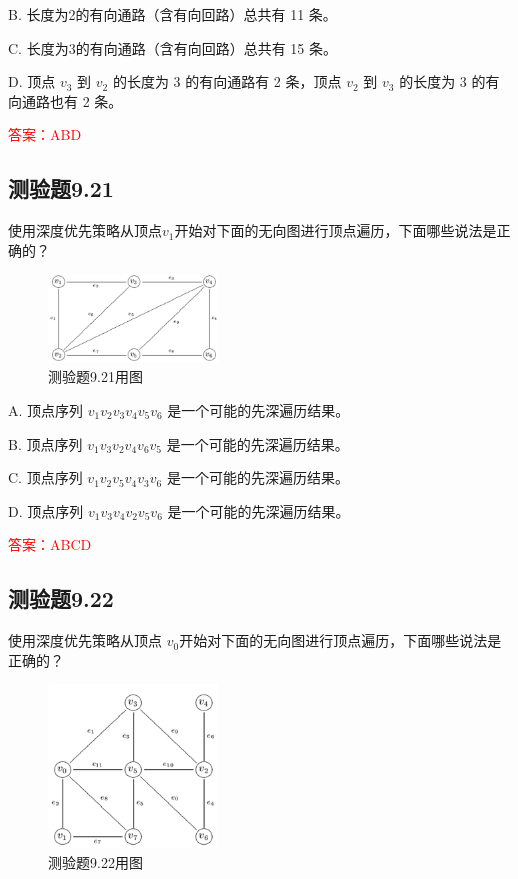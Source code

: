 \documentclass[UTF8, heading=true]{ctexart}
\begin{document}
B. 长度为2的有向通路（含有向回路）总共有 11 条。

C. 长度为3的有向通路（含有向回路）总共有 15 条。

D. 顶点 $v_3$ 到 $v_2$ 的长度为 3 的有向通路有 2 条，顶点 $v_2$ 到 $v_3$ 的长度为 3 的有向通路也有 2 条。

\textcolor{red}{答案：ABD}

\subsection{测验题9.21}

使用深度优先策略从顶点$v_1$开始对下面的无向图进行顶点遍历，下面哪些说法是正确的？

\begin{figure}[H]
  \centering
  \includegraphics[width=0.4\textwidth]{9.21.jpg} %
  \caption{测验题9.21用图}
\end{figure}

A. 顶点序列 $v_1 v_2 v_3 v_4 v_5 v_6$ 是一个可能的先深遍历结果。

B. 顶点序列 $v_1 v_3 v_2 v_4 v_6 v_5$ 是一个可能的先深遍历结果。

C. 顶点序列 $v_1 v_2 v_5 v_4 v_3 v_6$ 是一个可能的先深遍历结果。

D. 顶点序列 $v_1 v_3 v_4 v_2 v_5 v_6$ 是一个可能的先深遍历结果。

\textcolor{red}{答案：ABCD}

\subsection{测验题9.22}

使用深度优先策略从顶点
$v_0$开始对下面的无向图进行顶点遍历，下面哪些说法是正确的？

\begin{figure}[H]
  \centering
  \includegraphics[width=0.4\textwidth]{9.22.jpg} %
  \caption{测验题9.22用图}
\end{figure}
\end{document}
